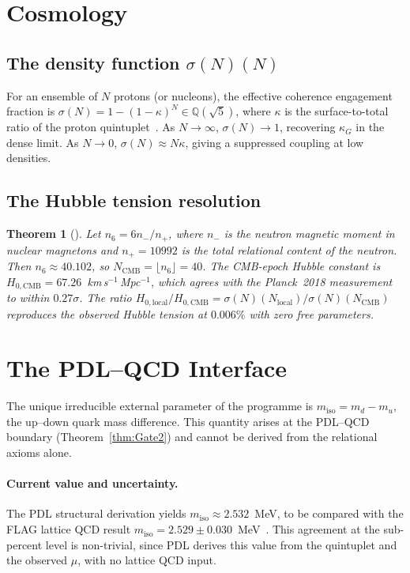 \documentclass[11pt,a4paper]{article}
\theoremstyle{plain}
\newtheorem{theorem}{Theorem}[section]
\theoremstyle{definition}
\theoremstyle{remark}
\newcommand{\sigmaN}{\sigma(N)}
\begin{document}
\section{Cosmology}
\label{sec:cosmology}

\subsection{The density function \texorpdfstring{$\sigmaN(N)$}{sigmaN(N)}}
\label{subsec:sigma}
For an ensemble of $N$ protons (or nucleons), the effective coherence engagement fraction is $\sigmaN=1-(1-\kappa)^N\in\mathbb{Q}(\sqrt{5})$, where $\kappa$ is the surface-to-total ratio of the proton quintuplet~\cite{D24,D26}. As $N\to\infty$, $\sigmaN\to 1$, recovering $\kappa_G$ in the dense limit. As $N\to0$, $\sigmaN\approx N\kappa$, giving a suppressed coupling at low densities.

\subsection{The Hubble tension resolution}
\label{subsec:hubble}
\begin{theorem}[\cite{D27,D35}]
\label{thm:hubble}
Let $n_6=6n_-/n_+$, where $n_-$ is the neutron magnetic moment in nuclear magnetons and $n_{+}=10992$ is the total relational content of the neutron. Then $n_6\approx 40.102$, so $N_{\mathrm{CMB}}=\lfloor n_6\rfloor=40$. The CMB-epoch Hubble constant is $H_{0,\mathrm{CMB}}=67.26$~km\,s$^{-1}$\,Mpc$^{-1}$, which agrees with the Planck~2018 measurement to within $0.27\sigma$. The ratio $H_{0,\mathrm{local}}/H_{0,\mathrm{CMB}}=\sigmaN(N_{\mathrm{local}})/\sigmaN(N_{\mathrm{CMB}})$ reproduces the observed Hubble tension at $0.006\%$ with zero free parameters.
\end{theorem}

\section{The PDL--QCD Interface}
\label{sec:QCD}
The unique irreducible external parameter of the programme is $m_{\mathrm{iso}}=m_d-m_u$, the up--down quark mass difference. This quantity arises at the PDL--QCD boundary (Theorem~\ref{thm:Gate2}) and cannot be derived from the relational axioms alone.

\paragraph{Current value and uncertainty.} The PDL structural derivation yields $m_{\mathrm{iso}}\approx 2.532$~MeV, to be compared with the FLAG lattice QCD result $m_{\mathrm{iso}}=2.529\pm0.030$~MeV~\cite{D30}. This agreement at the sub-percent level is non-trivial, since PDL derives this value from the quintuplet and the observed $\mu$, with no lattice QCD input.
\end{document}
